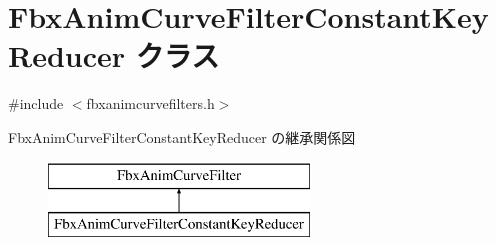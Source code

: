 \hypertarget{class_fbx_anim_curve_filter_constant_key_reducer}{}\section{Fbx\+Anim\+Curve\+Filter\+Constant\+Key\+Reducer クラス}
\label{class_fbx_anim_curve_filter_constant_key_reducer}


{\ttfamily \#include $<$fbxanimcurvefilters.\+h$>$}

Fbx\+Anim\+Curve\+Filter\+Constant\+Key\+Reducer の継承関係図\begin{figure}[H]
\begin{center}
\leavevmode
\includegraphics[height=2.000000cm]{class_fbx_anim_curve_filter_constant_key_reducer}
\end{center}
\end{figure}
